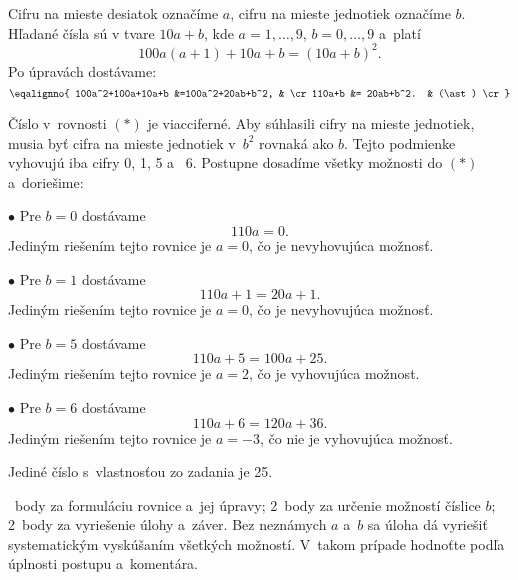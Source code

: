 {%
Cifru na mieste desiatok označíme $a$, cifru na mieste jednotiek označíme $b$.
Hľadané čísla sú v tvare $10a+b$, kde $a=1,\ldots,9$, $b=0,\ldots,9$ a~platí
$$
100a(a+1)+10a+b =(10a+b)^2.
$$
Po úpravách dostávame:
$$
\eqalignno{
  100a^2+100a+10a+b &=100a^2+20ab+b^2, & \cr
  110a+b &= 20ab+b^2. & (\ast) \cr
}
$$

Číslo v~rovnosti $(\ast)$ je viacciferné.
Aby súhlasili cifry na mieste jednotiek, musia byť cifra na mieste jednotiek v~$b^2$ rovnaká ako $b$.
Tejto podmienke vyhovujú iba cifry 0, 1, 5 a ~6.
Postupne dosadíme všetky možnosti do $(*)$ a~doriešime:

\smallskip
\item{$\bullet$} Pre $b=0$ dostávame $$110a=0.$$ Jediným riešením tejto rovnice je $a=0$, čo je nevyhovujúca možnosť.
\item{$\bullet$} Pre $b=1$ dostávame $$110a+1=20a+1.$$ Jediným riešením tejto rovnice je $a=0$, čo je nevyhovujúca možnosť.
\item{$\bullet$} Pre $b=5$ dostávame $$110a+5=100a+25.$$ Jediným riešením tejto rovnice je $a=2$, čo je vyhovujúca možnost.
\item{$\bullet$} Pre $b=6$ dostávame $$110a+6=120a+36.$$ Jediným riešením tejto rovnice je $a=-3$, čo nie je vyhovujúca možnosť.

\smallskip\noindent
Jediné číslo s~vlastnosťou zo zadania je 25.

~body za formuláciu rovnice a~jej úpravy;
2~body za určenie možností číslice $b$;
2~body za vyriešenie úlohy a~záver.
Bez neznámych $a$ a~$b$ sa úloha dá vyriešiť systematickým vyskúšaním všetkých možností.
V~takom prípade hodnoťte podľa úplnosti postupu a~komentára.
\endhodnotenie
}

